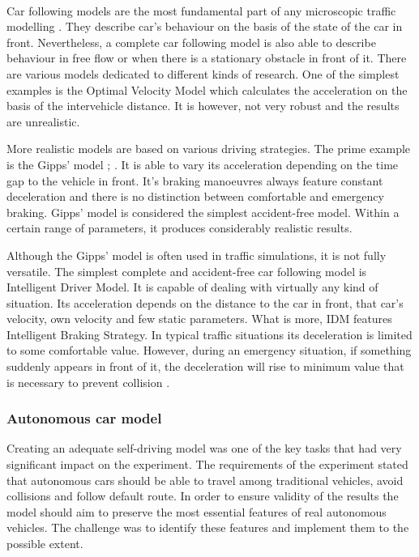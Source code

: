 \documentclass[11pt,english,twoside]{article}
\begin{document}
\paragraph{}
Car following models are the most fundamental part of any microscopic traffic modelling \citep{treiber2013traffic}. They describe car's behaviour on the basis of the state of the car in front. Nevertheless, a complete car following model is also able to describe behaviour in free flow or when there is a stationary obstacle in front of it. There are various models dedicated to different kinds of research. One of the simplest examples is the Optimal Velocity Model which calculates the acceleration on the basis of the intervehicle distance. It is however, not very robust and the results are unrealistic. 
\par
More realistic models are based on various driving strategies. The prime example is the Gipps' model \citep{treiber2013traffic}; \citep{rothery1992car}. It is able to vary its acceleration depending on the time gap to the vehicle in front. It's braking manoeuvres always feature constant deceleration and there is no distinction between comfortable and emergency braking. Gipps' model is considered the simplest accident-free model. Within a certain range of parameters, it produces considerably realistic results.
\par
Although the Gipps' model is often used in traffic simulations, it is not fully versatile. The simplest complete and accident-free car following model is Intelligent Driver Model. It is capable of  dealing with virtually any kind of situation. Its acceleration depends on the distance to the car in front, that car's velocity, own velocity and few static parameters. What is more, IDM features Intelligent Braking Strategy. In typical traffic situations its deceleration is limited to some comfortable value. However, during an emergency situation, if something suddenly appears in front of it, the deceleration will rise to minimum value that is necessary to prevent collision \citep{treiber2013traffic}.



\subsubsection{Autonomous car model}


Creating an adequate self-driving model was one of the key tasks that had very significant impact on the experiment. The requirements of the experiment stated that autonomous cars should be able to travel among traditional vehicles, avoid collisions and follow default route. In order to ensure validity of the results the model should aim to preserve the most essential features of real autonomous vehicles. The challenge was to identify these features and implement them to the possible extent. 
\end{document}
